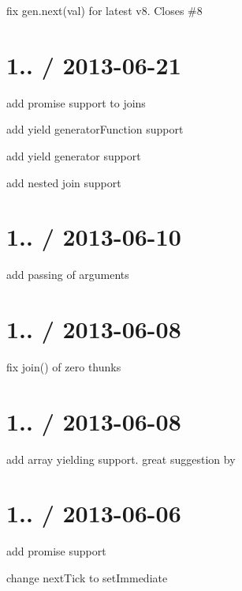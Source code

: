 \begin{DoxyItemize}
\item fix gen.\+next(val) for latest v8. Closes \#8
\end{DoxyItemize}

\section*{1.. / 2013-\/06-\/21 }


\begin{DoxyItemize}
\item add promise support to joins
\item add {\ttfamily yield generator\+Function} support
\item add {\ttfamily yield generator} support
\item add nested join support
\end{DoxyItemize}

\section*{1.. / 2013-\/06-\/10 }


\begin{DoxyItemize}
\item add passing of arguments
\end{DoxyItemize}

\section*{1.. / 2013-\/06-\/08 }


\begin{DoxyItemize}
\item fix join() of zero thunks
\end{DoxyItemize}

\section*{1.. / 2013-\/06-\/08 }


\begin{DoxyItemize}
\item add array yielding support. great suggestion by 
\end{DoxyItemize}

\section*{1.. / 2013-\/06-\/06 }


\begin{DoxyItemize}
\item add promise support
\item change next\+Tick to set\+Immediate 
\end{DoxyItemize}